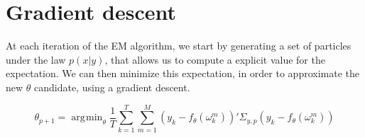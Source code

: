 \documentclass[10pt,a4paper]{report}
\DeclareMathOperator*{\argmin}{\arg\!\min}
\begin{document}
\section{Gradient descent}
At each iteration of the EM algorithm, we start by generating a set of particles under the law $p(x|y)$, that allows us to compute a explicit value for the expectation. We can then minimize this expectation, in order to approximate the new $\theta$ candidate, using a gradient descent.

$$
    \theta_{p+1} = \argmin_{\theta} \frac{1}{T}\sum_{k=1}^T \sum_{m=1}^M (y_k - f_{\theta}(\omega_k^m))' \Sigma_{y, p} (y_k - f_{\theta}(\omega_k^m))
$$
\end{document}
